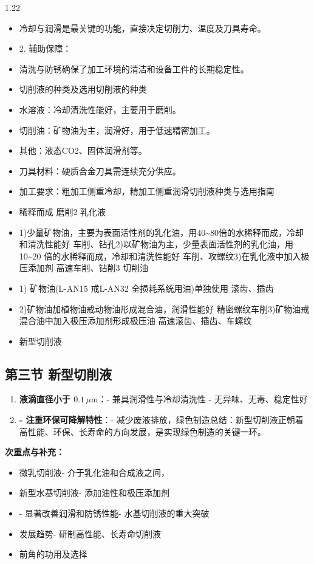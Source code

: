 \documentclass[12pt,a4paper]{article}
\begin{document}
\begin{spacing}{1.22}
\begin{itemize}[leftmargin=2.2em,label=--]
  \item 冷却与润滑是最关键的功能，直接决定切削力、温度及刀具寿命。
  \item 2. 辅助保障：
  \item 清洗与防锈确保了加工环境的清洁和设备工件的长期稳定性。
  \item 切削液的种类及选用切削液的种类
  \item 水溶液：冷却清洗性能好，主要用于磨削。
  \item 切削油：矿物油为主，润滑好，用于低速精密加工。
  \item 其他：液态CO2、固体润滑剂等。
  \item 刀具材料：硬质合金刀具需连续充分供应。
  \item 加工要求：粗加工侧重冷却，精加工侧重润滑切削液种类与选用指南
  \item 稀释而成 磨削2 乳化液
  \item 1)少量矿物油，主要为表面活性剂的乳化油，用40\textasciitilde{}80倍的水稀释而成，冷却和清洗性能好 车削、钻孔2)以矿物油为主，少量表面活性剂的乳化油，用10\textasciitilde{}20 倍的水稀释而成，冷却和清洗性能好 车削、攻螺纹3)在乳化液中加入极压添加剂 高速车削、钻削3 切削油
  \item 1) 矿物油(L-AN15 戒L-AN32 全损耗系统用油)单独使用 滚齿、插齿
  \item 2)矿物油加植物油戒动物油形成混合油，润滑性能好 精密螺纹车削3)矿物油戒混合油中加入极压添加剂形成极压油 高速滚齿、插齿、车螺纹
  \item 新型切削液
\end{itemize}

\subsection{第三节 新型切削液}
\begin{tcolorbox}[colback=yellow!6,colframe=red!55!black,title=重点,left=1mm,right=1mm]
\begin{enumerate}[leftmargin=2.2em,label=\arabic*.]
  \item \textbf{液滴直径小于 $0.1\,\mu\text{m}$}：- 兼具润滑性与冷却清洗性 - 无异味、无毒、稳定性好
  \item \textbf{- 注重环保可降解特性}：- 减少废液排放，绿色制造总结：新型切削液正朝着高性能、环保、长寿命的方向发展，是实现绿色制造的关键一环。
\end{enumerate}
\end{tcolorbox}
\noindent\textbf{次重点与补充：}
\begin{itemize}[leftmargin=2.2em,label=--]
  \item 微乳切削液- 介于乳化油和合成液之间，
  \item 新型水基切削液- 添加油性和极压添加剂
  \item - 显著改善润滑和防锈性能- 水基切削液的重大突破
  \item 发展趋势- 研制高性能、长寿命切削液
  \item 前角的功用及选择
\end{itemize}


\end{spacing}
\end{document}
